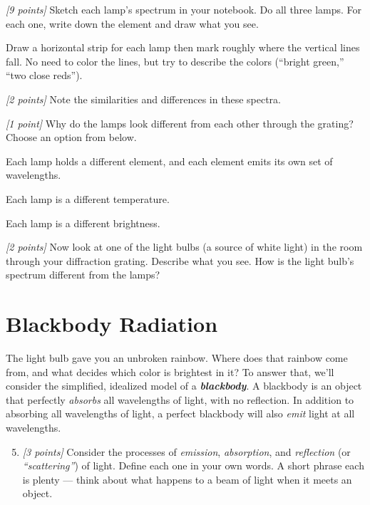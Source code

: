 \documentclass[11pt]{article}
\newenvironment{choices}
  {\begin{list}{}{%
     \setlength{\leftmargin}{2em}\setlength{\itemsep}{2pt}%
     \setlength{\topsep}{4pt}\setlength{\parsep}{0pt}}}
  {\end{list}}
\newcommand{\ch}[1]{\item[\textbf{(#1)}]}
\newcommand{\wlscale}{\hbox to \linewidth{\footnotesize
  400\hfill 450\hfill 500\hfill 550\hfill 600\hfill 650\hfill 700\,nm}}
\newcommand{\scaleref}{%
  \par\smallskip\noindent
  \fbox{\parbox[b][1.1cm][b]{0.96\textwidth}{\wlscale}}\par\smallskip}
\begin{document}
\begin{enumerate}
    \item \textit{[9 points]} Sketch each lamp's spectrum in your notebook. Do all three
    lamps. For each one, write down the element and draw what you see.

    \smallskip
      Draw a horizontal strip for each lamp then mark roughly where the vertical lines fall. No need to color the lines, but try to describe the colors
    (``bright green,'' ``two close reds''). 

    \scaleref

    \item \textit{[2 points]} Note the similarities and differences in these spectra.

    \item \textit{[1 point]} Why do the lamps look different from each other through the grating? Choose an option from below.
    \begin{choices}
      \ch{a} Each lamp holds a different element, and each element emits its own
             set of wavelengths.
      \ch{b} Each lamp is a different temperature.
      \ch{c} Each lamp is a different brightness.
    \end{choices}

    \item \textit{[2 points]} Now look at one of the light bulbs (a source of white light) in the room through your diffraction grating. Describe what you see. How is the light bulb's spectrum different from
    the lamps?
\end{enumerate}

\section{Blackbody Radiation}

The light bulb gave you an unbroken rainbow. Where does that rainbow come from, and what decides which color is brightest in it? To answer that, we'll consider the simplified, idealized model of a \textbf{\emph{blackbody}}. A blackbody is an object that perfectly \emph{absorbs} all wavelengths of light, with no reflection. In addition to absorbing all wavelengths of light, a perfect blackbody will also \emph{emit} light at all wavelengths.

\begin{enumerate}
    \setcounter{enumi}{4}
    \item \textit{[3 points]} Consider the processes of \emph{emission}, \emph{absorption}, and \emph{reflection} (or \emph{``scattering''}) of light.
    Define each one in your own words. A short phrase each is plenty
        --- think about what happens to a beam of light when it meets an object.
        
\end{enumerate}
\end{document}
